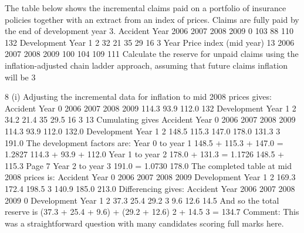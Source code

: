 \documentclass[a4paper,12pt]{article}
\begin{document}
 




The table below shows the incremental claims paid on a portfolio of insurance
policies together with an extract from an index of prices. Claims are fully paid by the
end of development year 3.
Accident Year
2006
2007
2008
2009
0
103
88
110
132
Development Year
1
2
32
21
35
29
16
3 Year Price index
(mid year)
13 2006
2007
2008
2009 100
104
109
111
Calculate the reserve for unpaid claims using the inflation-adjusted chain ladder
approach, assuming that future claims inflation will be 3%


8
(i)
Adjusting the incremental data for inflation to mid 2008 prices gives:
Accident Year 0
2006
2007
2008
2009 114.3
93.9
112.0
132
Development Year
1
2
34.2
21.4
35
29.5
16
3
13
Cumulating gives
Accident Year 0
2006
2007
2008
2009 114.3
93.9
112.0
132.0
Development Year
1
2
148.5
115.3
147.0
178.0
131.3
3
191.0
The development factors are:
Year 0 to year 1 148.5 + 115.3 + 147.0
= 1.2827
114.3 + 93.9 + 112.0
Year 1 to year 2 178.0 + 131.3
= 1.1726
148.5 + 115.3
Page 7%
Year 2 to year 3
191.0
= 1.0730
178.0
The completed table at mid 2008 prices is:
Accident Year
0
2006
2007
2008
2009
Development Year
1
2
169.3
172.4
198.5
3
140.9
185.0
213.0
Differencing gives:
Accident Year
2006
2007
2008
2009
0
Development Year
1
2
37.3
25.4
29.2
3
9.6
12.6
14.5
And so the total reserve is
(37.3 + 25.4 + 9.6)  + (29.2 + 12.6)  2 + 14.5  3 = 134.7
Comment: This was a straightforward question with many candidates scoring full marks
here.
\end{document}
